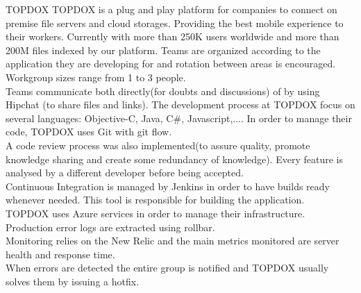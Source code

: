     \begin{companyreport}{TOPDOX}
      \product
      TOPDOX is a plug and play platform for companies to connect on premise file servers and cloud storages. Providing the best mobile experience to their workers. Currently with more than 250K users worldwide and more than 200M files indexed by our platform.
      \teams
      Teams are organized according to the application they are developing for and rotation between areas is encouraged.  Workgroup sizes range from 1 to 3 people. \\
      Teams communicate both directly(for doubts and discussions) of by using Hipchat (to share files and links).
      \development
      The development process at TOPDOX focus on several languages: Objective-C, Java, C\#, Javascript,.... In order to manage their code, TOPDOX uses Git with git flow. \\
      A code review process was also implemented(to assure quality, promote knowledge sharing and create some redundancy of knowledge). Every feature is analysed by a different developer before being accepted. \\
      Continuous Integration is managed by Jenkins in order to have builds ready whenever needed. This tool is responsible for building the application. \\
      \operations
      TOPDOX uses Azure services in order to manage their infrastructure. \\
      Production error logs are extracted using rollbar. \\
      Monitoring relies on the New Relic and the main metrics monitored are server health and response time. \\
      When errors are detected the entire group is notified and TOPDOX usually solves them by issuing a hotfix.
      \reportend
    \end{companyreport}

